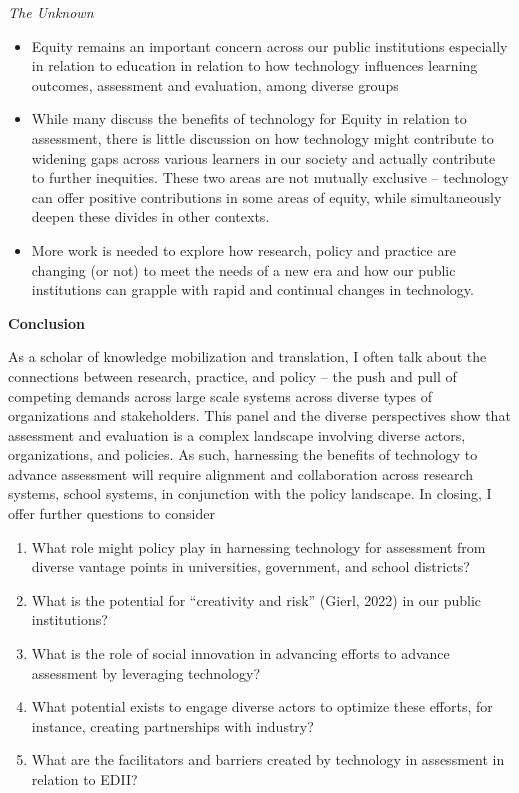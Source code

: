 \documentclass[
]{book}
\begin{document}
\emph{The Unknown}

\begin{itemize}
\item
  Equity remains an important concern across our public institutions especially in relation to education in relation to how technology influences learning outcomes, assessment and evaluation, among diverse groups
\item
  While many discuss the benefits of technology for Equity in relation to assessment, there is little discussion on how technology might contribute to widening gaps across various learners in our society and actually contribute to further inequities. These two areas are not mutually exclusive -- technology can offer positive contributions in some areas of equity, while simultaneously deepen these divides in other contexts.
\item
  More work is needed to explore how research, policy and practice are changing (or not) to meet the needs of a new era and how our public institutions can grapple with rapid and continual changes in technology.
\end{itemize}

\textbf{Conclusion}

As a scholar of knowledge mobilization and translation, I often talk about the connections between research, practice, and policy -- the push and pull of competing demands across large scale systems across diverse types of organizations and stakeholders. This panel and the diverse perspectives show that assessment and evaluation is a complex landscape involving diverse actors, organizations, and policies. As such, harnessing the benefits of technology to advance assessment will require alignment and collaboration across research systems, school systems, in conjunction with the policy landscape. In closing, I offer further questions to consider

\begin{enumerate}
\def\labelenumi{\arabic{enumi}.}
\item
  What role might policy play in harnessing technology for assessment from diverse vantage points in universities, government, and school districts?
\item
  What is the potential for ``creativity and risk'' (Gierl, 2022) in our public institutions?
\item
  What is the role of social innovation in advancing efforts to advance assessment by leveraging technology?
\item
  What potential exists to engage diverse actors to optimize these efforts, for instance, creating partnerships with industry?
\item
  What are the facilitators and barriers created by technology in assessment in relation to EDII?
\end{enumerate}
\end{document}
